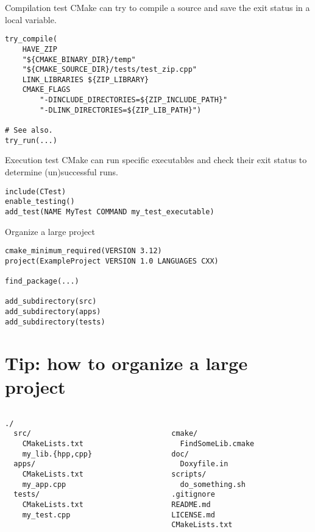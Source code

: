 \documentclass[aspectratio=169,11pt]{beamer}
\begin{document}
\begin{frame}[fragile]{Compilation test}
CMake can try to compile a source and save the exit status in a local variable.
\begin{verbatim}
try_compile(
    HAVE_ZIP
    "${CMAKE_BINARY_DIR}/temp"
    "${CMAKE_SOURCE_DIR}/tests/test_zip.cpp"
    LINK_LIBRARIES ${ZIP_LIBRARY}
    CMAKE_FLAGS
        "-DINCLUDE_DIRECTORIES=${ZIP_INCLUDE_PATH}"
        "-DLINK_DIRECTORIES=${ZIP_LIB_PATH}")

# See also.
try_run(...)
\end{verbatim}
\end{frame}

\begin{frame}[fragile]{Execution test}
CMake can run specific executables and check their exit status to determine (un)successful runs.
\begin{verbatim}
include(CTest)
enable_testing()
add_test(NAME MyTest COMMAND my_test_executable)
\end{verbatim}
\end{frame}

\begin{frame}[fragile]{Organize a large project}
\begin{verbatim}
cmake_minimum_required(VERSION 3.12)
project(ExampleProject VERSION 1.0 LANGUAGES CXX)

find_package(...)

add_subdirectory(src)
add_subdirectory(apps)
add_subdirectory(tests)
\end{verbatim}
\end{frame}

\section{Tip: how to organize a large project}
\begin{frame}
\Large
\begin{columns}[t]
    \begin{column}{0.5\textwidth}
        \begin{verbatim}
./
  src/
    CMakeLists.txt
    my_lib.{hpp,cpp}
  apps/
    CMakeLists.txt
    my_app.cpp
  tests/
    CMakeLists.txt
    my_test.cpp
        \end{verbatim}
    \end{column}
    \begin{column}{0.5\textwidth}
        \begin{verbatim}

  cmake/
    FindSomeLib.cmake
  doc/
    Doxyfile.in
  scripts/
    do_something.sh
  .gitignore
  README.md
  LICENSE.md
  CMakeLists.txt
        \end{verbatim}
    \end{column}
\end{columns}
\end{frame}
\addtocounter{framenumber}{1}
\end{document}
